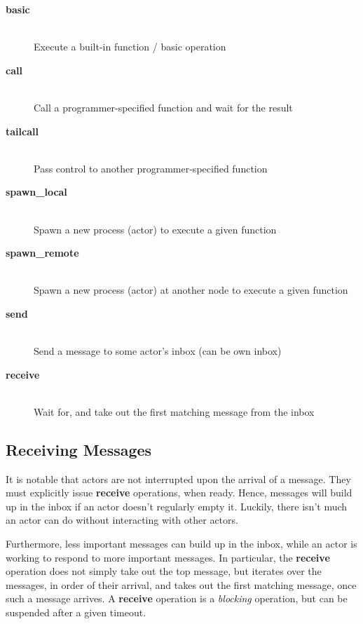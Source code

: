\begin{description}

\item[\textbf{basic}]\ \\ Execute a built-in function / basic
operation

\item[\textbf{call}]\ \\ Call a programmer-specified function and wait
for the result

\item[\textbf{tailcall}]\ \\ Pass control to another
programmer-specified function

\item[\textbf{spawn\_local}]\ \\ Spawn a new process (actor) to execute
a given function

\item[\textbf{spawn\_remote}]\ \\ Spawn a new process (actor) at
another node to execute a given function

\item[\textbf{send}]\ \\ Send a message to some actor's inbox (can be
own inbox)

\item[\textbf{receive}]\ \\ Wait for, and take out the first matching
message from the inbox

\end{description}

\subsection{Receiving Messages}

It is notable that actors are not interrupted upon the arrival of a
message. They must explicitly issue \textbf{receive} operations, when
ready. Hence, messages will build up in the inbox if an actor doesn't
regularly empty it. Luckily, there isn't much an actor can do without
interacting with other actors.

Furthermore, less important messages can build up in the inbox, while
an actor is working to respond to more important messages. In
particular, the \textbf{receive} operation does not simply take out
the top message, but iterates over the messages, in order of their
arrival, and takes out the first matching message, once such a message
arrives. A \textbf{receive} operation is a \emph{blocking} operation,
but can be suspended after a given timeout.

